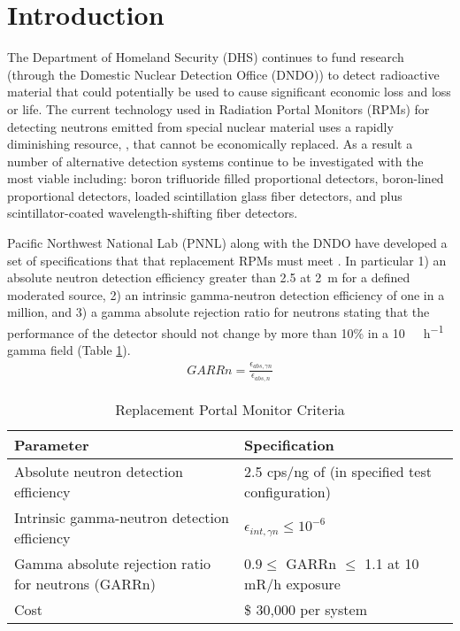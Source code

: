 \documentclass[draftcls,onecolumn]{IEEEtran}
\begin{document}
\section{Introduction}
\label{sec:Intro}
The Department of Homeland Security (DHS) continues to fund research (through the Domestic Nuclear Detection Office (DNDO)) to detect radioactive material that could potentially be used to cause significant economic loss and loss or life.  
The current technology used in Radiation Portal Monitors (RPMs) for detecting neutrons emitted from special nuclear material uses a rapidly diminishing resource, , that cannot be economically replaced. 
As a result a number of alternative detection systems continue to be investigated with the most viable including: boron trifluoride filled proportional detectors, boron-lined proportional detectors,  loaded scintillation glass fiber detectors, and  plus scintillator-coated wavelength-shifting fiber detectors\cite{pnnl_18471,kouzes_neutron_2010}.  

Pacific Northwest National Lab (PNNL) along with the DNDO have developed a set of specifications that that replacement RPMs must meet \cite{kouzes_neutron_2010, kouzes_neutron_1999}. 
In particular 1) an absolute neutron detection efficiency greater than \SI{2.5}{\cps} at \SI{2}{\meter} for a defined moderated  source, 2) an intrinsic gamma-neutron detection efficiency of one in a million, and 3) a gamma absolute rejection ratio for neutrons stating that the performance of the detector should not change by more than 10\% in a \SI{10}{\milli\roetgen\per\hour} gamma field (Table \ref{tab:DHSCritera}).
\begin{align}
  \label{eqn:garrn}
  GARRn = \frac{ \epsilon_{abs,\gamma n}}{\epsilon_{abs,n}}
\end{align}
\begin{table}
  \centering
	\caption{Replacement Portal Monitor Criteria}
	\begin{tabular}{m{2.5cm} m{2.5cm} }
	Parameter & Specification \\
	\hline
	\hline
	Absolute neutron detection efficiency & 2.5 cps/ng of \iso[252]{Cf} (in specified test configuration) \\
	Intrinsic gamma-neutron detection efficiency & $ \epsilon_{int,\gamma n}\leq 10^{-6}$ \\
	Gamma absolute rejection ratio for neutrons (GARRn) & $ 0.9 \leq \text{ GARRn }\leq$ 1.1 at 10 mR/h exposure \\
	Cost &  \$ 30,000 per system \\
	\end{tabular}
	\label{tab:DHSCritera}
\end{table}
\end{document}
